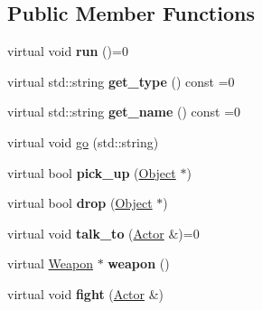 \subsection*{Public Member Functions}
\begin{DoxyCompactItemize}
\item 
\hypertarget{classda__game_1_1Actor_a4e1570c1f5ee72efaf2f17309e491d7e}{
virtual void {\bfseries run} ()=0}
\label{classda__game_1_1Actor_a4e1570c1f5ee72efaf2f17309e491d7e}

\item 
\hypertarget{classda__game_1_1Actor_adecbdf29f9cb31095b6b32fdf99dc72a}{
virtual std::string {\bfseries get\_\-type} () const =0}
\label{classda__game_1_1Actor_adecbdf29f9cb31095b6b32fdf99dc72a}

\item 
\hypertarget{classda__game_1_1Actor_a53656847acff24bc249e507d31909b86}{
virtual std::string {\bfseries get\_\-name} () const =0}
\label{classda__game_1_1Actor_a53656847acff24bc249e507d31909b86}

\item 
virtual void \hyperlink{classda__game_1_1Actor_a6be7923ecbacabf779eda60f1f78bb72}{go} (std::string)
\item 
\hypertarget{classda__game_1_1Actor_ae960301665570de24c8e20915228f61f}{
virtual bool {\bfseries pick\_\-up} (\hyperlink{classda__game_1_1Object}{Object} $\ast$)}
\label{classda__game_1_1Actor_ae960301665570de24c8e20915228f61f}

\item 
\hypertarget{classda__game_1_1Actor_a412f9a1ef89acffa948e92434179143d}{
virtual bool {\bfseries drop} (\hyperlink{classda__game_1_1Object}{Object} $\ast$)}
\label{classda__game_1_1Actor_a412f9a1ef89acffa948e92434179143d}

\item 
\hypertarget{classda__game_1_1Actor_a4106856b26e95ba76708da5b0e497cc7}{
virtual void {\bfseries talk\_\-to} (\hyperlink{classda__game_1_1Actor}{Actor} \&)=0}
\label{classda__game_1_1Actor_a4106856b26e95ba76708da5b0e497cc7}

\item 
\hypertarget{classda__game_1_1Actor_ae7194d1dba4026c8333f9bc12041ce84}{
virtual \hyperlink{classda__game_1_1Weapon}{Weapon} $\ast$ {\bfseries weapon} ()}
\label{classda__game_1_1Actor_ae7194d1dba4026c8333f9bc12041ce84}

\item 
\hypertarget{classda__game_1_1Actor_a54f63c010e082f31dc3cbdbbfb7238e1}{
virtual void {\bfseries fight} (\hyperlink{classda__game_1_1Actor}{Actor} \&)}
\label{classda__game_1_1Actor_a54f63c010e082f31dc3cbdbbfb7238e1}

\end{DoxyCompactItemize}

